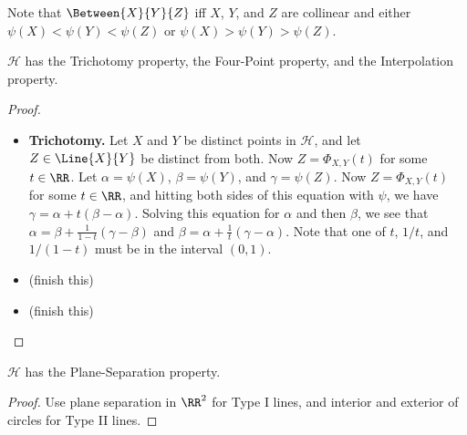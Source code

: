 \documentclass{article}
\begin{document}
Note that $\Between{X}{Y}{Z}$ iff $X$, $Y$, and $Z$ are collinear and either $\psi(X) < \psi(Y) < \psi(Z)$ or $\psi(X) > \psi(Y) > \psi(Z)$.

\begin{prop}
$\mathcal{H}$ has the Trichotomy property, the Four-Point property, and the Interpolation property.
\end{prop}

\begin{proof} \mbox{}
\begin{itemize}
\item \textbf{Trichotomy.} Let $X$ and $Y$ be distinct points in $\mathcal{H}$, and let $Z \in \Line{X}{Y}$ be distinct from both. Now $Z = \Phi_{X,Y}(t)$ for some $t \in \RR$. Let $\alpha = \psi(X)$, $\beta = \psi(Y)$, and $\gamma = \psi(Z)$. Now $Z = \Phi_{X,Y}(t)$ for some $t \in \RR$, and hitting both sides of this equation with $\psi$, we have $\gamma = \alpha + t(\beta - \alpha)$. Solving this equation for $\alpha$ and then $\beta$, we see that $\alpha = \beta + \frac{1}{1-t}(\gamma - \beta)$ and $\beta = \alpha + \frac{1}{t}(\gamma - \alpha)$. Note that one of $t$, $1/t$, and $1/(1-t)$ must be in the interval $(0,1)$.
\item (finish this)
\item (finish this)
\end{itemize}
\end{proof}

\begin{prop}
$\mathcal{H}$ has the Plane-Separation property.
\end{prop}

\begin{proof}
Use plane separation in $\RR^2$ for Type I lines, and interior and exterior of circles for Type II lines.
\end{proof}
\end{document}
